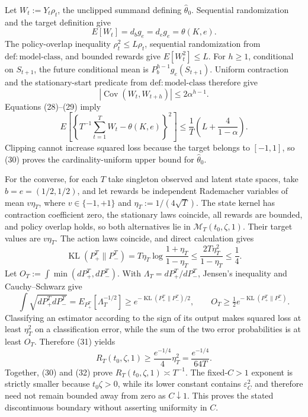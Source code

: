 Let \(W_t:=Y_t\rho_t\), the unclipped summand defining \(\widehat\theta_0\).  Sequential randomization and the target definition give
\[
 E[W_t]=d_bg_e=d_eg_e=\theta(K,e). \tag{28}
\]
The policy-overlap inequality \(\rho_t^2\le L\rho_t\), sequential randomization from \(\mathrm{def{:}model\text{-}class}\), and bounded rewards give \(E[W_t^2]\le L\).  For \(h\ge1\), conditional on \(S_{t+1}\), the future conditional mean is \(P_b^{h-1}g_e(S_{t+1})\).  Uniform contraction and the stationary-start predicate from \(\mathrm{def{:}model\text{-}class}\) therefore give
\[
 |\operatorname{Cov}(W_t,W_{t+h})|\le2\alpha^{h-1}. \tag{29}
\]
Equations (28)--(29) imply
\[
 E\!\left[\left\{T^{-1}\sum_{t=1}^TW_t-\theta(K,e)\right\}^2\right]
 \le\frac1T\left(L+\frac4{1-\alpha}\right). \tag{30}
\]
Clipping cannot increase squared loss because the target belongs to \([-1,1]\), so (30) proves the cardinality-uniform upper bound for \(\widehat\theta_0\).

For the converse, for each \(T\) take singleton observed and latent state spaces, take \(b=e=(1/2,1/2)\), and let rewards be independent Rademacher variables of mean \(v\eta_T\), where \(v\in\{-1,+1\}\) and \(\eta_T:=1/(4\sqrt T)\).  The state kernel has contraction coefficient zero, the stationary laws coincide, all rewards are bounded, and policy overlap holds, so both alternatives lie in \(\mathcal M_T(t_0,\zeta,1)\).  Their target values are \(v\eta_T\).  The action laws coincide, and direct calculation gives
\[
 \operatorname{KL}(P_+^T\|P_-^T)
 =T\eta_T\log\frac{1+\eta_T}{1-\eta_T}
 \le\frac{2T\eta_T^2}{1-\eta_T}\le\frac14. \tag{31}
\]
Let \(O_T:=\int\min(dP_+^T,dP_-^T)\).  With \(\Lambda_T=dP_+^T/dP_-^T\), Jensen's inequality and Cauchy--Schwarz give
\[
 \int\sqrt{dP_+^TdP_-^T}
 =E_{P_+^T}[\Lambda_T^{-1/2}]
 \ge e^{-\operatorname{KL}(P_+^T\|P_-^T)/2},
 \qquad
 O_T\ge\tfrac12e^{-\operatorname{KL}(P_+^T\|P_-^T)}.
\]
Classifying an estimator according to the sign of its output makes squared loss at least \(\eta_T^2\) on a classification error, while the sum of the two error probabilities is at least \(O_T\).  Therefore (31) yields
\[
 R_T(t_0,\zeta,1)\ge \frac{e^{-1/4}}{4}\eta_T^2
 =\frac{e^{-1/4}}{64T}. \tag{32}
\]
Together, (30) and (32) prove \(R_T(t_0,\zeta,1)\asymp T^{-1}\).  The fixed-\(C>1\) exponent is strictly smaller because \(t_0\zeta>0\), while its lower constant contains \(\varepsilon_C^2\) and therefore need not remain bounded away from zero as \(C\downarrow1\).  This proves the stated discontinuous boundary without asserting uniformity in \(C\).


